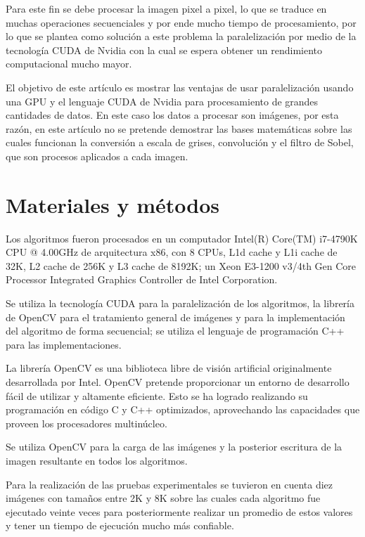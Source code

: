 \documentclass[10pt,journal,compsoc]{IEEEtran}
\begin{document}
Para este fin se debe procesar la imagen pixel a pixel, lo que se traduce en muchas operaciones secuenciales y por ende mucho tiempo de procesamiento, por lo que se plantea como solución a este problema la paralelización por medio de la tecnología CUDA\cite{CUDAZone} de Nvidia con la cual se espera obtener un rendimiento computacional mucho mayor.

El objetivo de este artículo es mostrar las ventajas de usar paralelización usando una GPU y el lenguaje CUDA de Nvidia para procesamiento de grandes cantidades de datos. En este caso los datos a procesar son imágenes, por esta razón, en este artículo no se pretende demostrar las bases matemáticas sobre las cuales funcionan la conversión a escala de grises, convolución y el filtro de Sobel, que son procesos aplicados a cada imagen.


\section{Materiales y métodos}

Los algoritmos fueron procesados en un computador Intel(R) Core(TM) i7-4790K CPU @ 4.00GHz de arquitectura x86, con 8 CPUs,  L1d cache y L1i cache de 32K, L2 cache de 256K y L3 cache de 8192K; un Xeon E3-1200 v3/4th Gen Core Processor Integrated Graphics Controller de Intel Corporation.


Se utiliza la tecnología CUDA para la paralelización de los algoritmos, la librería de OpenCV\cite{opencv} para el tratamiento general de imágenes y para la implementación del algoritmo de forma secuencial; se utiliza el lenguaje de programación C++\cite{c++} para las implementaciones.

La librería OpenCV es una biblioteca libre de visión artificial originalmente desarrollada por Intel. OpenCV pretende proporcionar un entorno de desarrollo fácil de utilizar y altamente eficiente. Esto se ha logrado realizando su programación en código C y C++ optimizados, aprovechando las capacidades que proveen los procesadores multinúcleo\cite{4rios}.


Se utiliza OpenCV para la carga de las imágenes y la posterior escritura de la imagen resultante  en todos los algoritmos.

Para la realización de las pruebas experimentales se tuvieron en cuenta diez imágenes con tamaños entre 2K y 8K sobre las cuales cada algoritmo fue ejecutado veinte veces para posteriormente realizar un promedio de estos  valores y tener un tiempo de ejecución mucho más confiable.
\end{document}
